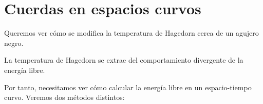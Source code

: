 \chapter{Cuerdas en espacios curvos}

Queremos ver cómo se modifica la temperatura de Hagedorn cerca de un agujero negro.

La temperatura de Hagedorn se extrae del comportamiento divergente de la energía libre.


Por tanto, necesitamos ver cómo calcular la energía libre en un espacio-tiempo curvo.
Veremos dos métodos distintos:
